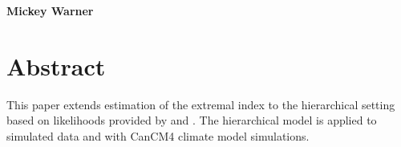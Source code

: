 \begin{Large}
\noindent \textbf{Hierarchical estimation of the extremal index
\end{Large}
\bigskip

\noindent \textbf{Mickey Warner}

\section{Abstract}
\label{abstract}

This paper extends estimation of the extremal index to the hierarchical setting based on likelihoods provided by \cite{ferro2003inference} and \cite{suveges2007likelihood}.            The hierarchical model is applied to simulated data and with CanCM4 climate model simulations.
